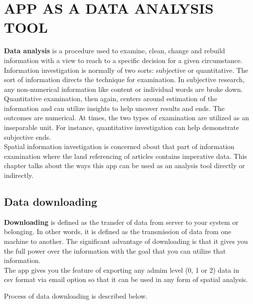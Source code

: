 \chapter{APP AS A DATA ANALYSIS TOOL}
\label{chap:analysis_tool}

\textbf{Data analysis} is a procedure used to examine, clean, change and rebuild information with a view to reach to a specific decision for a given circumstance. Information investigation is normally of two sorts: subjective or quantitative. The sort of information directs the technique for examination. In subjective research, any non-numerical information like content or individual words are broke down. Quantitative examination, then again, centers around estimation of the information and can utilize insights to help uncover results and ends. The outcomes are numerical. At times, the two types of examination are utilized as an inseparable unit. For instance, quantitative investigation can help demonstrate subjective ends. \\

Spatial information investigation is concerned about that part of information examination where the land referencing of articles contains imperative data. This chapter talks about the ways this app can be used as an analysis tool directly or indirectly. \\

\section{Data downloading}

\textbf{Downloading} is defined as the transfer of data from server to your system or belonging. In other words, it is defined as the transmission of data from one machine to another. The significant advantage of downloading is that it gives you the full power over the information with the goal that you can utilize that information. \\

The app gives you the feature of exporting any admim level (0, 1 or 2) data in \gls{csv} format via email option so that it can be used in any form of spatial analysis.

Process of data downloading is described below.

